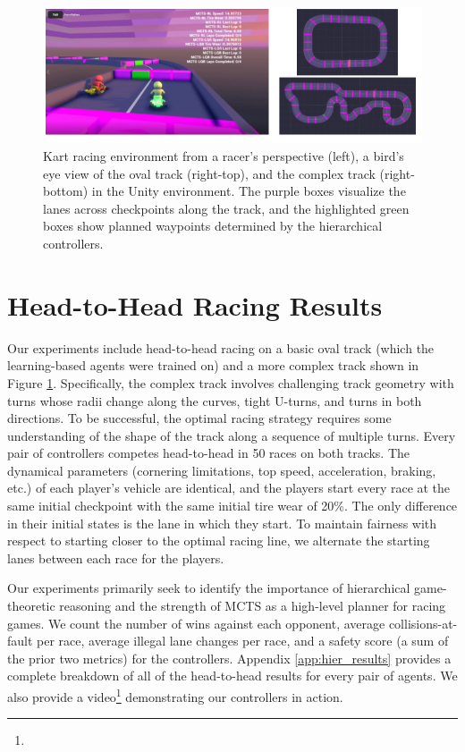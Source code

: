 \begin{figure}
  \centering
  \includegraphics[width=\textwidth]{Figures/UnityEnvironment.png}
  \caption[Screenshots of Unity simulation environment] {Kart racing environment from a racer's perspective (left), a bird's eye view of the oval track (right-top), and the complex track (right-bottom) in the Unity environment. The purple boxes visualize the lanes across checkpoints along the track, and the highlighted green boxes show planned waypoints determined by the hierarchical controllers.}
  \label{fig:experiment_tracks}
\end{figure}
\section{Head-to-Head Racing Results}
Our experiments include head-to-head racing on a basic oval track (which the learning-based agents were trained on) and a more complex track shown in Figure \ref{fig:experiment_tracks}. Specifically, the complex track involves challenging track geometry with turns whose radii change along the curves, tight U-turns, and turns in both directions. To be successful, the optimal racing strategy requires some understanding of the shape of the track along a sequence of multiple turns. Every pair of controllers competes head-to-head in 50 races on both tracks. The dynamical parameters (cornering limitations, top speed, acceleration, braking, etc.) of each player's vehicle are identical, and the players start every race at the same initial checkpoint with the same initial tire wear of 20\%. The only difference in their initial states is the lane in which they start. To maintain fairness with respect to starting closer to the optimal racing line, we alternate the starting lanes between each race for the players.

Our experiments primarily seek to identify the importance of hierarchical game-theoretic reasoning and the strength of MCTS as a high-level planner for racing games. We count the number of wins against each opponent, average collisions-at-fault per race, average illegal lane changes per race, and a safety score (a sum of the prior two metrics) for the controllers. Appendix \ref{app:hier_results} provides a complete breakdown of all of the head-to-head results for every pair of agents. We also provide a video\footnote{\vidurl} demonstrating our controllers in action. 

